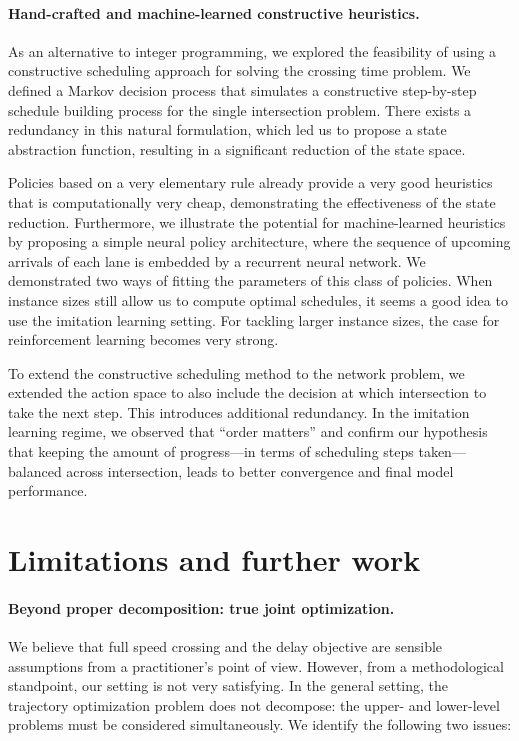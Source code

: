 \documentclass[a4paper]{report}
\theoremstyle{definition}
\theoremstyle{plain}
\begin{document}
\paragraph{Hand-crafted and machine-learned constructive heuristics.}

As an alternative to integer programming, we explored the feasibility of using a
constructive scheduling approach for solving the crossing time problem.
%
We defined a Markov decision process that simulates a constructive step-by-step
schedule building process for the single intersection problem.
%
There exists a redundancy in this natural formulation, which led us to propose a
state abstraction function, resulting in a significant reduction of the state
space.

Policies based on a very elementary rule already provide a very good heuristics
that is computationally very cheap, demonstrating the effectiveness of the state
reduction.
%
Furthermore, we illustrate the potential for machine-learned heuristics by
proposing a simple neural policy architecture, where the sequence of upcoming
arrivals of each lane is embedded by a recurrent neural network.
%
We demonstrated two ways of fitting the parameters of this class of policies.
%
When instance sizes still allow us to compute optimal schedules, it seems a good
idea to use the imitation learning setting.
%
For tackling larger instance sizes, the case for reinforcement learning becomes
very strong.

To extend the constructive scheduling method to the network problem, we extended
the action space to also include the decision at which intersection to take the
next step.
%
This introduces additional redundancy. In the imitation learning regime, we
observed that ``order matters'' and confirm our hypothesis that keeping the
amount of progress---in terms of scheduling steps taken---balanced across
intersection, leads to better convergence and final model performance.


\section{Limitations and further work}

\paragraph{Beyond proper decomposition: true joint optimization.}

We believe that full speed crossing and the delay objective are sensible
assumptions from a practitioner's point of view.
%
However, from a methodological standpoint, our setting is not very satisfying.
%
In the general setting, the trajectory optimization problem does not decompose:
the upper- and lower-level problems must be considered simultaneously.
%
We identify the following two issues:
\end{document}
